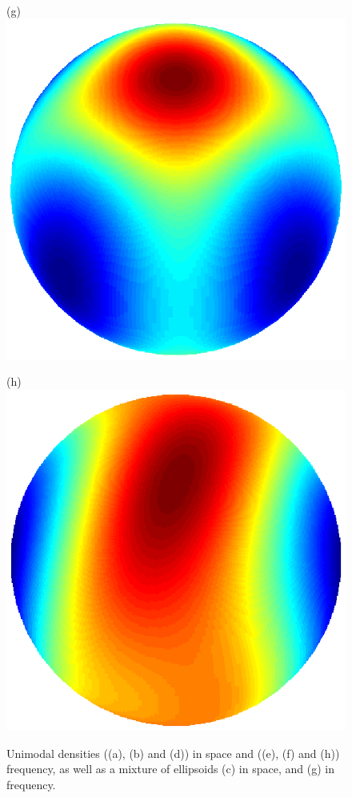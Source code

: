 \documentclass[dvips,aoas,preprint]{imsart}
\numberwithin{equation}{section}
\theoremstyle{plain}
\begin{document}
\begin{figure}[!htbp]
\begin{minipage}[]{0.10\textwidth}
  \end{minipage}
  \begin{minipage}[]{0.10\textwidth}
    \centering
    (g)
    \includegraphics*[width=\textwidth]{infreq3.ps}
  \end{minipage}
  \begin{minipage}[]{0.10\textwidth}
    \centering
    (h)
    \includegraphics*[width=\textwidth]{infreq0.ps}
  \end{minipage}
  \caption[]{Unimodal densities ((a), (b) and (d)) in space and ((e),
    (f) and (h)) frequency, as well as a mixture of ellipsoids (c) in
    space, and (g) in frequency.}
  \label{fig:inrha}
\end{figure}
\end{document}
